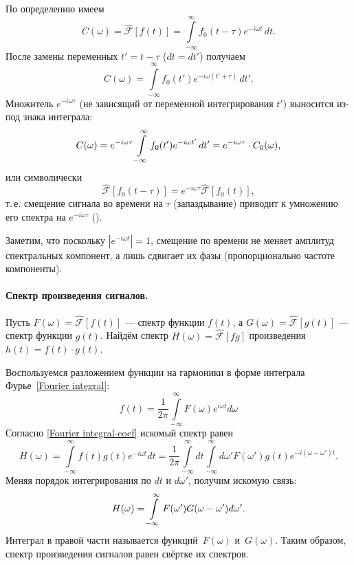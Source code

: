 По определению имеем
\begin{equation*}
  C(\omega)=\hat{\mathcal{F}}[f(t)]=\int\limits_{-\infty}^\infty f_0(t-\tau)e^{-i\omega t}\,dt.
\end{equation*}
После замены переменных $t'=t-\tau$ ($dt=dt'$) получаем
\begin{equation*}
  C(\omega)=\int\limits_{-\infty}^\infty f_0(t') e^{-i\omega(t'+\tau)}\,dt'.
\end{equation*}
Множитель $e^{-i\omega\tau}$ (не зависящий от переменной интегрирования $t'$)
выносится из-под знака интеграла:
\begin{equation}
  \eqmark{task-freq-shift}
  C(\omega)=e^{-i\omega\tau}\int\limits_{-\infty}^\infty f_0(t')e^{-i\omega
t'}\,dt'= e^{-i\omega\tau} \cdot C_0(\omega),
\end{equation}
или символически
\begin{equation*}
\hat{\mathcal{F}}[f_0(t-\tau)] = e^{-i\omega\tau} \hat{\mathcal{F}}[f_0(t)],
\end{equation*}
т.\,е. смещение сигнала во времени на $\tau$ (запаздывание)
приводит к умножению его спектра на $e^{-i\omega\tau}$ ().

Заметим, что поскольку $|e^{-i\omega t}|=1$, смещение по времени не меняет
амплитуд спектральных компонент, а лишь сдвигает их фазы (пропорционально частоте
компоненты).

\paragraph{Спектр произведения сигналов.}
Пусть $F(\omega)=\hat{\mathcal{F}}[f(t)]$ --- спектр функции $f(t)$, а
$G(\omega)=\hat{\mathcal{F}}[g(t)]$ ---
спектр функции $g(t)$. Найдём спектр $H(\omega)=\hat{\mathcal{F}}[fg]$
произведения $h(t)=f(t)\cdot g(t)$.

Воспользуемся разложением функции на гармоники в форме
интеграла Фурье~\eqref{Fourier integral}:
\begin{equation*}
f(t) = \frac{1}{2\pi} \int\limits_{-\infty}^{\infty} F(\omega)e^{i\omega t} d\omega
\end{equation*}
Согласно \eqref{Fourier integral-coef} искомый спектр равен
\begin{equation*}
H(\omega) = \int\limits_{-\infty}^{\infty} f(t) g(t) e^{-i\omega t} dt =
\frac{1}{2\pi} \int\limits_{-\infty}^{\infty} dt
\int\limits_{-\infty}^{\infty} d\omega' F(\omega') g(t) e^{-i(\omega-\omega')t}.
\end{equation*}
Меняя порядок интегрирования по $dt$ и $d\omega'$, получим искомую связь:
\begin{equation}
    \eqmark{folding}
H(\omega) = \int\limits_{-\infty}^{\infty} F(\omega')G(\omega-\omega') d\omega'.
\end{equation}
Интеграл в правой части называется 
функций~$F(\omega)$ и~$G(\omega)$. Таким образом, спектр произведения сигналов
равен свёртке их спектров.

